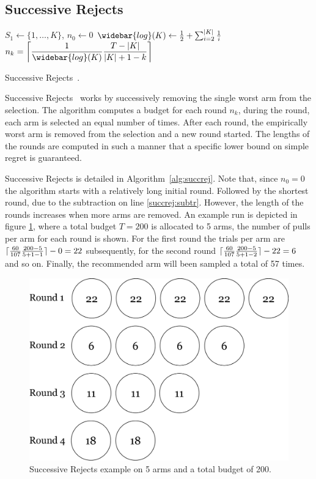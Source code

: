 \documentclass{kecsmstr}
\DeclarePairedDelimiter{\ceil}{\lceil}{\rceil}
\begin{document}
\subsection{Successive Rejects}
\IncMargin{1em}
\begin{algorithm2e}[ht]
	\Indm
	\vspace{0.2cm}
	\Indp
	$S_1 \gets \{1,\dots,K\}$, $n_0 \gets 0$										\; 
	$\widebar{log}(K) \gets \frac{1}{2} + \sum_{i=2}^{|K|} \frac{1}{i}$				\;
	\BlankLine
	 {
		$n_k = \displaystyle\ceil[\bigg]{\frac{1}{\widebar{log}(K)} \frac{T-|K|}{|K|+1-k}}$				\;
	}
	\BlankLine
	\BlankLine
  \caption[Successive Rejects]{Successive Rejects~\protect{}. \label{alg:succrej}}
\end{algorithm2e}
\DecMargin{1em}

Successive Rejects~ works by successively removing the single worst arm from the selection. The algorithm computes a budget for each round $n_k$, during the round, each arm is selected an equal number of times. After each round, the empirically worst arm is removed from the selection and a new round started. The lengths of the rounds are computed in such a manner that a specific lower bound on simple regret is guaranteed.

Successive Rejects is detailed in Algorithm~\ref{alg:succrej}. Note that, since $n_0 = 0$ the algorithm starts with a relatively long initial round. Followed by the shortest round, due to the subtraction on line \ref{succrej:subtr}. However, the length of the rounds increases when more arms are removed. An example run is depicted in figure \ref{fig:succ-rej}, where a total budget $T = 200$ is allocated to 5 arms, the number of pulls per arm for each round is shown. For the first round the trials per arm are $\ceil{\frac{60}{107} \frac{200-5}{5+1-1}} - 0 = 22$ subsequently, for the second round $\ceil{\frac{60}{107} \frac{200-5}{5+1-2}} - 22 = 6$ and so on. Finally, the recommended arm will been sampled a total of 57 times.

\begin{figure}[ht]
	\centering
	\includegraphics[width=.6\textwidth]{img/succ_rej.png}
	\caption{Successive Rejects example on 5 arms and a total budget of 200.}
	\label{fig:succ-rej}
\end{figure}
\end{document}
